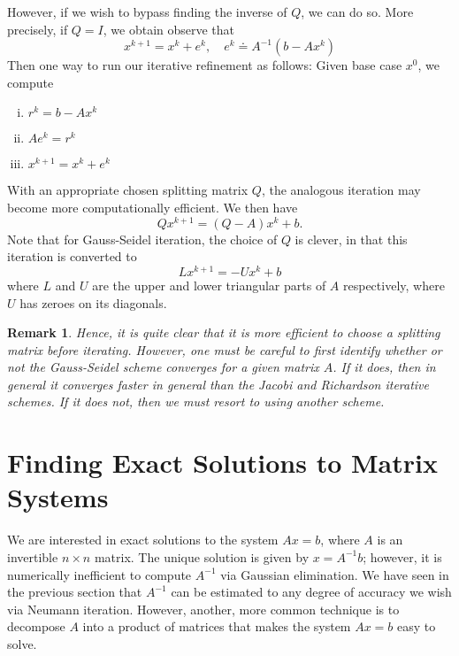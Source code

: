 \documentclass[12pt,reqno]{amsart}
\numberwithin{equation}{section}  %
\newtheorem*{remark}{Remark}
\begin{document}
However, if we wish to bypass finding the inverse of $Q$, we can do so. More precisely, if
$Q = I$, we obtain
observe that
\begin{equation*}
x^{k+1} = x^{k} + e^{k}, \quad e^{k} \doteq A^{-1}(b - Ax^{k})
\end{equation*}
Then one way to run our iterative refinement as follows: Given base case $x^{0}$, we compute 
\begin{enumerate}[i)]
\item $r^{k} = b - Ax^{k}$
\item $Ae^{k} = r^{k}$
\item $x^{k+1} = x^{k} + e^{k}$
\end{enumerate}
With an appropriate chosen splitting matrix $Q$, the analogous iteration may become
more computationally efficient. We then have
\begin{equation*}
Qx^{k+1} = (Q - A)x^{k} + b.
\end{equation*}
Note that for Gauss-Seidel iteration, the choice of $Q$ is clever, in that this
iteration  is converted to 
\begin{equation*}
L x^{k+1} = - U x^{k} + b
\end{equation*}
where $L$ and $U$ are the upper and lower triangular parts of $A$ respectively,
where $U$ has zeroes on its diagonals. 

\begin{remark}
Hence, it is quite clear that it is more efficient to choose a splitting matrix
before iterating. However, one must be careful to first identify whether or not
the Gauss-Seidel scheme converges for a given matrix $A$. If it does, then in
general it converges faster in general than the Jacobi and Richardson iterative
schemes. If it does not, then we must resort to using another scheme.
\end{remark}
\section{Finding Exact Solutions to Matrix Systems}
We are interested in exact solutions to the system $Ax = b$, 
where $A$ is an invertible $n \times n$ matrix. The unique solution
is given by $x = A^{-1}b$; however, it is numerically inefficient
to compute $A^{-1}$ via Gaussian elimination. We have seen in the previous
section that $A^{-1}$ can be estimated to any degree of accuracy we wish
via Neumann iteration. However, another, more common technique is 
to decompose $A$ into a product of matrices that makes the system $Ax = b$
easy to solve. 
\end{document}
